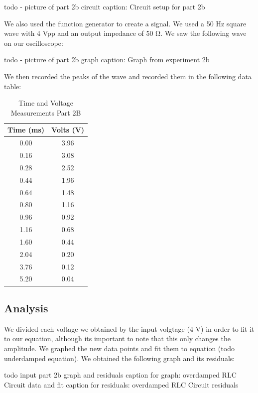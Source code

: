 \documentclass[11pt]{article}
\begin{document}
    todo - picture of part 2b circuit
    caption: Circuit setup for part 2b

    We also used the function generator to create a signal. We used a 50 Hz square wave with 4 Vpp and an output impedance of 50 Ω. We saw the following wave on our oscilloscope:

    todo - picture of part 2b graph
    caption: Graph from experiment 2b

    We then recorded the peaks of the wave and recorded them in the following data table:

    \begin{table}[h]
        \centering
        \caption{Time and Voltage Measurements Part 2B}
        \begin{tabular}{cc}
            \toprule
            \textbf{Time (ms)} & \textbf{Volts (V)} \\
            \midrule
            0.00 & 3.96 \\
            0.16 & 3.08 \\
            0.28 & 2.52 \\
            0.44 & 1.96 \\
            0.64 & 1.48 \\
            0.80 & 1.16 \\
            0.96 & 0.92 \\
            1.16 & 0.68 \\
            1.60 & 0.44 \\
            2.04 & 0.20 \\
            3.76 & 0.12 \\
            5.20 & 0.04 \\
            \bottomrule
        \end{tabular}
    \end{table}


    \subsection{Analysis}\label{subsec:part2b_analysis}
    We divided each voltage we obtained by the input volgtage (4 V) in
    order to fit it to our equation, although its important to note that
    this only changes the amplitude. We graphed the new data points and fit
    them to equation (todo underdamped equation). We obtained the following
    graph and its residuals:

    todo input part 2b graph and residuals
    caption for graph: overdamped RLC Circuit data and fit
    caption for residuals: overdamped RLC Circuit residuals
\end{document}
